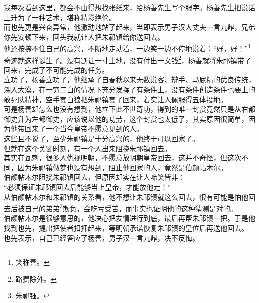 \begin{multicols}{\theparacolNo}
我每次看到这里，都会不由得想找张纸来，给杨善先生写个服字。杨善先生把说话上升为了一种艺术，堪称精彩绝伦。\\

而也先更是兴奋异常，他激动地站了起来，当即表示男子汉大丈夫一言九鼎，兄弟你先安顿下来，回头我就让人把朱祁镇给你送回去。\\

他还按捺不住自己的高兴，不断地走动着，一边笑一边不停地说着：“好，好！”\footnote{笑称善。}\\

奇迹就这样诞生了。没有割让一寸土地，没有付出一文钱\footnote{路费除外。}，杨善就将朱祁镇带了回来，完成了不可能完成的任务。\\

立功了，杨善立功了，他继承了自春秋以来无数说客、辩手、马屁精的优良传统，深入大漠，在一穷二白的情况下充分发挥了有条件上，没有条件创造条件也要上的敢死队精神，空手套白狼把朱祁镇套了回来，着实让人佩服得五体投地。\\

可是杨善却怎么也没有想到，他立下此不世奇功，得到的唯一封赏竟然只是从右都御史升为左都御史，应该说以他的功劳，这个封赏也太低了，其实原因很简单，因为他带回来了一个当今皇帝不愿意见到的人。\\

这些且不说了，至少朱祁镇是十分高兴的，他终于可以回家了。\\

但就在这个关键时刻，有一个人出来阻挠朱祁镇回去。\\

其实在瓦剌，很多人仇视明朝，不愿意放明朝皇帝回去，这并不奇怪，但这次不同，因为朱祁镇做梦也没有想到，阻止他回家的人，竟然是伯颜帖木尔。\\

伯颜帖木尔阻挠朱祁镇回去，但原因却实在让人啼笑皆非：\\

“必须保证朱祁镇回去后能够当上皇帝，才能放他走！”\\

从伯颜帖木尔和朱祁镇的关系看，他不想让朱祁镇就这么回去，很有可能是怕他回去后被自己的弟弟\footnote{朱祁钰。}欺负，会吃亏受苦，而事实也证明他的这种猜测是对的。\\

伯颜帖木尔是很够意思的，他决心把友情进行到底，最后再帮朱祁镇一把。于是他找到也先，提出把使者扣押起来，等明朝承诺恢复朱祁镇的皇位后再送他回去。\\

也先表示，自己已经答应了杨善，男子汉一言九鼎，决不反悔。\\


\end{multicols}
